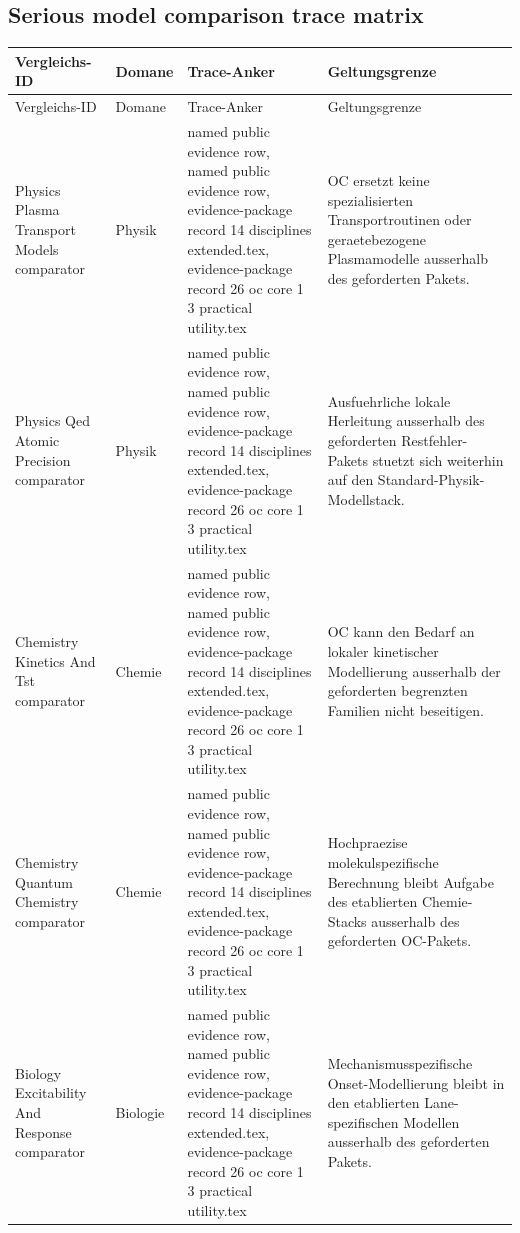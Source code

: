 \subsection{Serious model comparison trace matrix}
\begin{longtable}{@{}L{0.20\textwidth}L{0.11\textwidth}L{0.33\textwidth}L{0.28\textwidth}@{}}
\toprule
Vergleichs-ID & Domane & Trace-Anker & Geltungsgrenze \\
\midrule
\endfirsthead
\toprule
Vergleichs-ID & Domane & Trace-Anker & Geltungsgrenze \\
\midrule
\endhead
Physics Plasma Transport Models comparator & Physik & named public evidence row, named public evidence row, \allowbreak evidence-package record 14 disciplines extended.tex, \allowbreak evidence-package record 26 oc core 1 3 practical utility.tex & OC ersetzt keine spezialisierten Transportroutinen oder geraetebezogene Plasmamodelle ausserhalb des geforderten Pakets. \\
Physics Qed Atomic Precision comparator & Physik & named public evidence row, named public evidence row, \allowbreak evidence-package record 14 disciplines extended.tex, \allowbreak evidence-package record 26 oc core 1 3 practical utility.tex & Ausfuehrliche lokale Herleitung ausserhalb des geforderten Restfehler-Pakets stuetzt sich weiterhin auf den Standard-Physik-Modellstack. \\
Chemistry Kinetics And Tst comparator & Chemie & named public evidence row, named public evidence row, \allowbreak evidence-package record 14 disciplines extended.tex, \allowbreak evidence-package record 26 oc core 1 3 practical utility.tex & OC kann den Bedarf an lokaler kinetischer Modellierung ausserhalb der geforderten begrenzten Familien nicht beseitigen. \\
Chemistry Quantum Chemistry comparator & Chemie & named public evidence row, named public evidence row, \allowbreak evidence-package record 14 disciplines extended.tex, \allowbreak evidence-package record 26 oc core 1 3 practical utility.tex & Hochpraezise molekulspezifische Berechnung bleibt Aufgabe des etablierten Chemie-Stacks ausserhalb des geforderten OC-Pakets. \\
Biology Excitability And Response comparator & Biologie & named public evidence row, named public evidence row, \allowbreak evidence-package record 14 disciplines extended.tex, \allowbreak evidence-package record 26 oc core 1 3 practical utility.tex & Mechanismusspezifische Onset-Modellierung bleibt in den etablierten Lane-spezifischen Modellen ausserhalb des geforderten Pakets. \\

\end{longtable}
